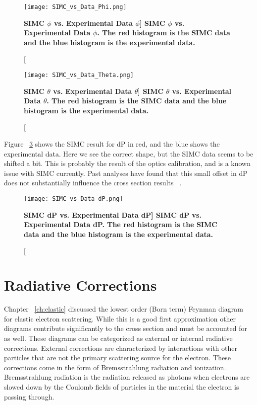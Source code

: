 \begin{figure}[!ht]
\begin{center}
\texttt{[image: SIMC\_vs\_Data\_Phi.png]}
\end{center}
\caption[\bf{SIMC $\phi$ vs. Experimental Data $\phi$}]{
{\bf{SIMC $\phi$ vs. Experimental Data $\phi$.}} The red histogram is the SIMC data and the blue histogram is the experimental data.}
\label{fig:simc_phi}
\end{figure}

\begin{figure}[!ht]
\begin{center}
\texttt{[image: SIMC\_vs\_Data\_Theta.png]}
\end{center}
\caption[\bf{SIMC $\theta$ vs. Experimental Data $\theta$}]{
{\bf{SIMC $\theta$ vs. Experimental Data $\theta$.}} The red histogram is the SIMC data and the blue histogram is the experimental data.}
\label{fig:simc_theta}
\end{figure}

Figure ~\ref{fig:simc_dp} shows the SIMC result for dP in red, and the blue shows the experimental data. Here we see the correct shape, but the SIMC data seems to be shifted a bit. This is probably the result of the optics calibration, and is a known issue with SIMC currently. Past analyses have found that this small offset in dP does not substantially influence the cross section results ~\cite{dien}.

\begin{figure}[!ht]
\begin{center}
\texttt{[image: SIMC\_vs\_Data\_dP.png]}
\end{center}
\caption[\bf{SIMC dP vs. Experimental Data dP}]{
{\bf{SIMC dP vs. Experimental Data dP.}} The red histogram is the SIMC data and the blue histogram is the experimental data.}
\label{fig:simc_dp}
\end{figure}

\section{Radiative Corrections}
\label{sec:rc}

Chapter ~\ref{ch:elastic} discussed the lowest order (Born term) Feynman diagram for elastic electron scattering. While this is a good first approximation other diagrams contribute significantly to the cross section and must be accounted for as well. These diagrams can be categorized as external or internal radiative corrections. External corrections are characterized by interactions with other particles that are not the primary scattering source for the electron. These corrections come in the form of Bremsstrahlung radiation and ionization. Bremsstrahlung radiation is the radiation released as photons when electrons are slowed down by the Coulomb fields of particles in the material the electron is passing through. 

